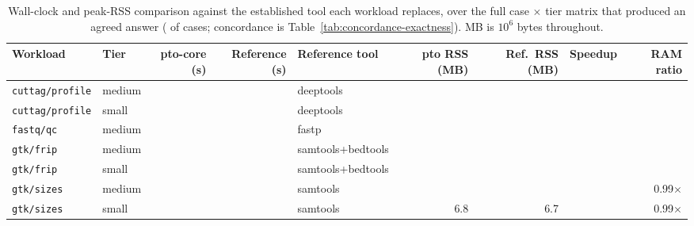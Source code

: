 \begin{table}[t]
\centering
\caption{Wall-clock and peak-RSS comparison against the established tool each
workload replaces, over the full case $\times$ tier matrix that produced an
agreed answer (\NumBenchCases{} of \NumBenchCases{} cases; concordance is
Table~\ref{tab:concordance-exactness}). MB is $10^6$ bytes throughout.}
\label{tab:pareto-benchmarks}
\footnotesize
\setlength{\tabcolsep}{4pt}
\begin{tabular}{llrrlrrrr}
\toprule
Workload & Tier & pto-core (s) & Reference (s) & Reference tool & pto RSS (MB) & Ref.\ RSS (MB) & Speedup & RAM ratio \\
\midrule
\texttt{cuttag/profile} & medium & \CuttagWallMedium{} & \DeeptoolsWallMedium{} & deeptools & \CuttagRssMedium{} & \DeeptoolsRssMedium{} & \NumCuttagSpeedupMedium{} & \NumCuttagRamMedium{} \\
\texttt{cuttag/profile} & small  & \CuttagWallSmall{} & \DeeptoolsWallSmall{} & deeptools & \CuttagRssSmall{} & \DeeptoolsRssSmall{} & \NumCuttagSpeedupSmall{} & \NumCuttagRamSmall{} \\
\texttt{fastq/qc}       & medium & \FastqQcWallMedium{} & \FastpWallMedium{} & fastp & \FastqQcRssMedium{} & \FastpRssMedium{} & \NumFastqSpeedup{} & \NumFastqRam{} \\
\texttt{gtk/frip}       & medium & \GtkFripWallMedium{} & \RefFripWallMedium{} & samtools+bedtools & \GtkFripRssMedium{} & \RefFripRssMedium{} & \NumFripSpeedupMedium{} & \NumFripRamMedium{} \\
\texttt{gtk/frip}       & small  & \GtkFripWallSmall{} & \RefFripWallSmall{} & samtools+bedtools & \GtkFripRssSmall{} & \RefFripRssSmall{} & \NumFripSpeedupSmall{} & \NumFripRamSmall{} \\
\texttt{gtk/sizes}      & medium & \GtkSizesWallMedium{} & \RefSizesWallMedium{} & samtools & \GtkSizesRssMedium{} & \RefSizesRssMedium{} & \NumSizesSpeedupMedium{} & 0.99$\times$ \\
\texttt{gtk/sizes}      & small  & \GtkSizesWallSmall{} & \RefSizesWallSmall{} & samtools & 6.8 & 6.7 & \NumSizesSpeedupSmall{} & 0.99$\times$ \\
\bottomrule
\end{tabular}


\end{table}

